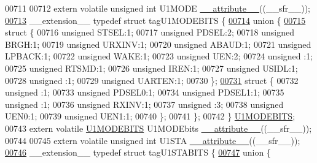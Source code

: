 \begin{DoxyCode}
00711 
00712 \textcolor{keyword}{extern} \textcolor{keyword}{volatile} \textcolor{keywordtype}{unsigned} \textcolor{keywordtype}{int}  U1MODE \hyperlink{a00015_a493c46f03454991ccc5aa7a6e1dfb2a7}{\_\_attribute\_\_}((\_\_sfr\_\_));
\hypertarget{a00015_source_l00713}{}\hyperlink{a00014}{00713} \_\_extension\_\_ \textcolor{keyword}{typedef} \textcolor{keyword}{struct }tagU1MODEBITS \{
\hypertarget{a00015_source_l00714}{}\hyperlink{a00015}{00714}   \textcolor{keyword}{union }\{
\hypertarget{a00015_source_l00715}{}\hyperlink{a00015}{00715}     \textcolor{keyword}{struct }\{
00716       \textcolor{keywordtype}{unsigned} STSEL:1;
00717       \textcolor{keywordtype}{unsigned} PDSEL:2;
00718       \textcolor{keywordtype}{unsigned} BRGH:1;
00719       \textcolor{keywordtype}{unsigned} URXINV:1;
00720       \textcolor{keywordtype}{unsigned} ABAUD:1;
00721       \textcolor{keywordtype}{unsigned} LPBACK:1;
00722       \textcolor{keywordtype}{unsigned} WAKE:1;
00723       \textcolor{keywordtype}{unsigned} UEN:2;
00724       \textcolor{keywordtype}{unsigned} :1;
00725       \textcolor{keywordtype}{unsigned} RTSMD:1;
00726       \textcolor{keywordtype}{unsigned} IREN:1;
00727       \textcolor{keywordtype}{unsigned} USIDL:1;
00728       \textcolor{keywordtype}{unsigned} :1;
00729       \textcolor{keywordtype}{unsigned} UARTEN:1;
00730     \};
\hypertarget{a00015_source_l00731}{}\hyperlink{a00015}{00731}     \textcolor{keyword}{struct }\{
00732       \textcolor{keywordtype}{unsigned} :1;
00733       \textcolor{keywordtype}{unsigned} PDSEL0:1;
00734       \textcolor{keywordtype}{unsigned} PDSEL1:1;
00735       \textcolor{keywordtype}{unsigned} :1;
00736       \textcolor{keywordtype}{unsigned} RXINV:1;
00737       \textcolor{keywordtype}{unsigned} :3;
00738       \textcolor{keywordtype}{unsigned} UEN0:1;
00739       \textcolor{keywordtype}{unsigned} UEN1:1;
00740     \};
00741   \};
00742 \} \hyperlink{a00014_dd/d70/a00835}{U1MODEBITS};
00743 \textcolor{keyword}{extern} \textcolor{keyword}{volatile} \hyperlink{a00014_dd/d70/a00835}{U1MODEBITS} U1MODEbits \hyperlink{a00015_a493c46f03454991ccc5aa7a6e1dfb2a7}{\_\_attribute\_\_}((\_\_sfr\_\_));
00744 
00745 \textcolor{keyword}{extern} \textcolor{keyword}{volatile} \textcolor{keywordtype}{unsigned} \textcolor{keywordtype}{int}  U1STA \hyperlink{a00015_a493c46f03454991ccc5aa7a6e1dfb2a7}{\_\_attribute\_\_}((\_\_sfr\_\_));
\hypertarget{a00015_source_l00746}{}\hyperlink{a00014}{00746} \_\_extension\_\_ \textcolor{keyword}{typedef} \textcolor{keyword}{struct }tagU1STABITS \{
\hypertarget{a00015_source_l00747}{}\hyperlink{a00015}{00747}   \textcolor{keyword}{union }\{

\end{DoxyCode}
